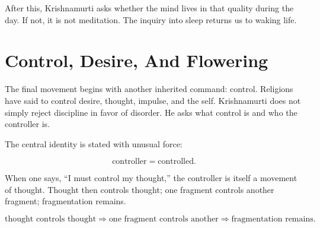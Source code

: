 \begin{figure}
\centering
{}
\end{figure}

After this, Krishnamurti asks whether the mind lives in that quality during the day. If not, it is not meditation. The inquiry into sleep returns us to waking life.

\section{Control, Desire, And Flowering}

The final movement begins with another inherited command: control. Religions have said to control desire, thought, impulse, and the self. Krishnamurti does not simply reject discipline in favor of disorder. He asks what control is and who the controller is.

The central identity is stated with unusual force:

\begin{equation}
\text{controller} = \text{controlled}.
\end{equation}

When one says, ``I must control my thought,'' the controller is itself a movement of thought. Thought then controls thought; one fragment controls another fragment; fragmentation remains.

\begin{equation}
\text{thought controls thought}
\Rightarrow
\text{one fragment controls another}
\Rightarrow
\text{fragmentation remains}.
\end{equation}

